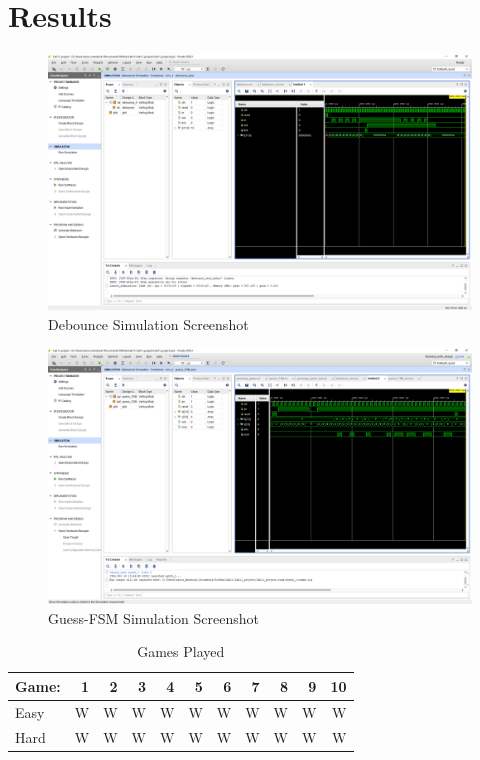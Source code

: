 \documentclass[11pt]{article}
\begin{document}
\section*{Results}

\begin{figure}[ht]\centering
	\includegraphics[width=1\textwidth,trim=19cm 15cm 0.5cm 4.5cm,clip]{debounce_test_screenshot}
	\caption{Debounce Simulation Screenshot}
	\label{fig:sim_with_table}
\end{figure}

\begin{figure}[ht]\centering
	\includegraphics[width=1\textwidth,trim=19cm 15cm 0.5cm 4.5cm,clip]{guess_FSM_screenshot}
	\caption{Guess-FSM Simulation Screenshot}
	\label{fig:sim_with_table}
\end{figure}

\begin{table}[ht]\centering
	\caption{Games Played}
	\label{ALU:tbl:alu_ERT}\medskip
	\begin{tabular}{l|rrrrrrrrrr}
		Game: & 1 & 2 & 3 & 4 & 5 & 6 & 7 & 8 & 9 & 10 \\
		\midrule
		Easy & W & W & W & W & W & W & W & W & W & W \\
		Hard & W & W & W & W & W & W & W & W & W & W \\
		\bottomrule
	\end{tabular}
\end{table}
\end{document}

